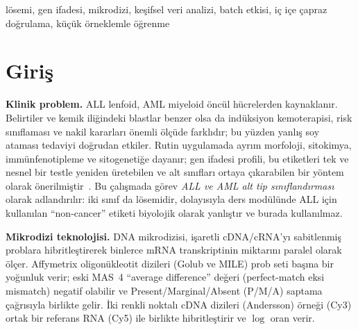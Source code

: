 \documentclass[conference]{IEEEtran}
\begin{document}
\begin{IEEEkeywords}
lösemi, gen ifadesi, mikrodizi, keşifsel veri analizi, batch etkisi, iç içe çapraz doğrulama, küçük örneklemle öğrenme
\end{IEEEkeywords}

\section{Giriş}
\textbf{Klinik problem.} ALL lenfoid, AML miyeloid öncül hücrelerden kaynaklanır. Belirtiler ve
kemik iliğindeki blastlar benzer olsa da indüksiyon kemoterapisi, risk sınıflaması ve nakil
kararları önemli ölçüde farklıdır; bu yüzden yanlış soy ataması tedaviyi doğrudan etkiler. Rutin
uygulamada ayrım morfoloji, sitokimya, immünfenotipleme ve sitogenetiğe dayanır; gen ifadesi
profili, bu etiketleri tek ve nesnel bir testle yeniden üretebilen ve alt sınıfları ortaya
çıkarabilen bir yöntem olarak önerilmiştir~\cite{golub1999,haferlach2010}. Bu çalışmada görev
\emph{ALL ve AML alt tip sınıflandırması} olarak adlandırılır: iki sınıf da lösemidir, dolayısıyla
ders modülünde ALL için kullanılan ``non-cancer'' etiketi biyolojik olarak yanlıştır ve burada
kullanılmaz.

\textbf{Mikrodizi teknolojisi.} DNA mikrodizisi, işaretli cDNA/cRNA'yı sabitlenmiş problara
hibritleştirerek binlerce mRNA transkriptinin miktarını paralel olarak ölçer. Affymetrix
oligonükleotit dizileri (Golub ve MILE) prob seti başına bir yoğunluk verir; eski MAS~4 ``average
difference'' değeri (perfect-match eksi mismatch) negatif olabilir ve Present/Marginal/Absent
(P/M/A) saptama çağrısıyla birlikte gelir. İki renkli noktalı cDNA dizileri (Andersson) örneği
(Cy3) ortak bir referans RNA (Cy5) ile birlikte hibritleştirir ve $\log$ oran verir.
\end{document}
